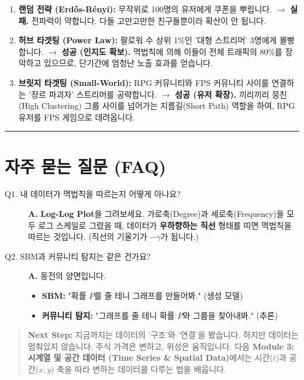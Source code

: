 \documentclass[11pt,a4paper]{book}
\theoremstyle{definition}
\begin{document}
\begin{enumerate}
    \item \textbf{랜덤 전략 (Erdős-Rényi):}
    무작위로 100명의 유저에게 쿠폰을 뿌립니다.
    $\rightarrow$ \textbf{실패.} 전파력이 약합니다. 다들 고만고만한 친구들뿐이라 확산이 안 됩니다.
    
    \item \textbf{허브 타겟팅 (Power Law):}
    팔로워 수 상위 1\%인 '대형 스트리머' 3명에게 몰빵합니다.
    $\rightarrow$ \textbf{성공 (인지도 확보).} 멱법칙에 의해 이들이 전체 트래픽의 80\%를 장악하고 있으므로, 단기간에 엄청난 노출 효과를 얻습니다.
    
    \item \textbf{브릿지 타겟팅 (Small-World):}
    RPG 커뮤니티와 FPS 커뮤니티 사이를 연결하는 '장르 파괴자' 스트리머를 공략합니다.
    $\rightarrow$ \textbf{성공 (유저 확장).} 끼리끼리 뭉친(High Clustering) 그룹 사이를 넘어가는 지름길(Short Path) 역할을 하여, RPG 유저를 FPS 게임으로 데려옵니다.
\end{enumerate}

\vspace{0.5cm}\hrule\vspace{0.5cm}

\section{자주 묻는 질문 (FAQ)}

\begin{description}
    \item[Q1. 내 데이터가 멱법칙을 따르는지 어떻게 아나요?]
    \textbf{A.} \textbf{Log-Log Plot}을 그려보세요. 가로축(Degree)과 세로축(Frequency)을 모두 로그 스케일로 그렸을 때, 데이터가 \textbf{우하향하는 직선} 형태를 띠면 멱법칙을 따르는 것입니다. (직선의 기울기가 $-\gamma$가 됩니다.)
    
    \item[Q2. SBM과 커뮤니티 탐지는 같은 건가요?]
    \textbf{A.} 동전의 양면입니다.
    \begin{itemize}
        \item \textbf{SBM:} "확률 $P$를 줄 테니 그래프를 만들어봐." (생성 모델)
        \item \textbf{커뮤니티 탐지:} "그래프를 줄 테니 확률 $P$와 그룹을 찾아내봐." (추론)
    \end{itemize}
\end{description}

\vspace{1cm}
\begin{quote}
\textbf{Next Step:} 지금까지는 데이터의 '구조'와 '연결'을 봤습니다. 하지만 데이터는 멈춰있지 않습니다. 주식 가격은 변하고, 위성은 움직입니다. 다음 \textbf{Module 3: 시계열 및 공간 데이터 (Time Series \& Spatial Data)}에서는 시간($t$)과 공간($x,y$) 축을 따라 변하는 데이터를 다루는 법을 배웁니다.
\end{quote}
\end{document}
